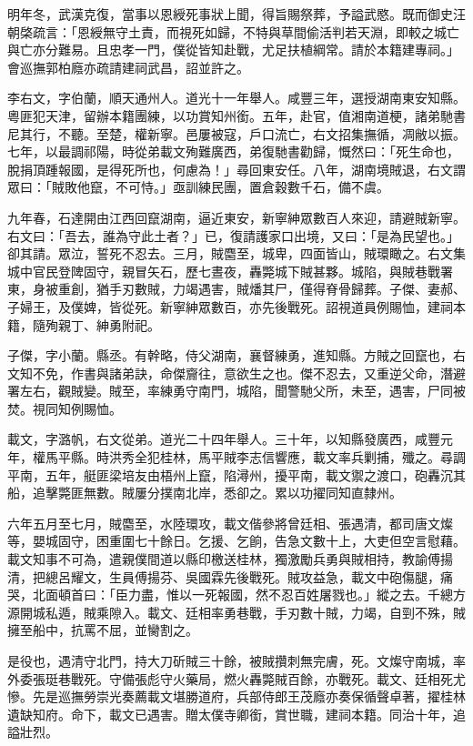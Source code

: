 \begin{pinyinscope}
明年冬，武漢克復，當事以恩綬死事狀上聞，得旨賜祭葬，予謚武愍。既而御史汪朝棨疏言：「恩綬無守土責，而視死如歸，不特與草間偷活判若天淵，即較之城亡與亡亦分難易。且忠孝一門，僕從皆知赴戰，尤足扶植綱常。請於本籍建專祠。」會巡撫郭柏廕亦疏請建祠武昌，詔並許之。

李右文，字伯蘭，順天通州人。道光十一年舉人。咸豐三年，選授湖南東安知縣。粵匪犯天津，留辦本籍團練，以功賞知州銜。五年，赴官，值湘南道梗，諸弟馳書尼其行，不聽。至楚，權新寧。邑屢被寇，戶口流亡，右文招集撫循，凋敝以振。七年，以最調祁陽，時從弟載文殉難廣西，弟復馳書勸歸，慨然曰：「死生命也，脫捐頂踵報國，是得死所也，何慮為！」尋回東安任。八年，湖南境賊退，右文謂眾曰：「賊敗他竄，不可恃。」亟訓練民團，置倉穀數千石，備不虞。

九年春，石達開由江西回竄湖南，逼近東安，新寧紳眾數百人來迎，請避賊新寧。右文曰：「吾去，誰為守此土者？」已，復請護家口出境，又曰：「是為民望也。」卻其請。眾泣，誓死不忍去。三月，賊麕至，城卑，四面皆山，賊環瞰之。右文集城中官民登陴固守，親冒矢石，歷七晝夜，轟斃城下賊甚夥。城陷，與賊巷戰署東，身被重創，猶手刃數賊，力竭遇害，賊燔其尸，僅得脊骨歸葬。子傑、妻郝、子婦王，及僕婢，皆從死。新寧紳眾數百，亦先後戰死。詔視道員例賜恤，建祠本籍，隨殉親丁、紳勇附祀。

子傑，字小蘭。縣丞。有幹略，侍父湖南，襄督練勇，進知縣。方賊之回竄也，右文知不免，作書與諸弟訣，命傑齎往，意欲生之也。傑不忍去，又重逆父命，潛避署左右，觀賊變。賊至，率練勇守南門，城陷，聞警馳父所，未至，遇害，尸同被焚。視同知例賜恤。

載文，字潞帆，右文從弟。道光二十四年舉人。三十年，以知縣發廣西，咸豐元年，權馬平縣。時洪秀全犯桂林，馬平賊李志信響應，載文率兵剿捕，殲之。尋調平南，五年，艇匪梁培友由梧州上竄，陷潯州，擾平南，載文禦之渡口，砲轟沉其船，追擊斃匪無數。賊屢分撲南北岸，悉卻之。累以功擢同知直隸州。

六年五月至七月，賊麕至，水陸環攻，載文偕參將曾廷相、張遇清，都司唐文燦等，嬰城固守，困重圍七十餘日。乞援、乞餉，告急文數十上，大吏但空言慰藉。載文知事不可為，遣親僕間道以縣印檄送桂林，獨激勵兵勇與賊相持，教諭傅揚清，把總呂耀文，生員傅揚芬、吳國霖先後戰死。賊攻益急，載文中砲傷腿，痛哭，北面頓首曰：「臣力盡，惟以一死報國，然不忍百姓屠戮也。」縱之去。千總方源開城私遁，賊乘隙入。載文、廷相率勇巷戰，手刃數十賊，力竭，自剄不殊，賊擁至船中，抗罵不屈，並臠割之。

是役也，遇清守北門，持大刀斫賊三十餘，被賊攢刺無完膚，死。文燦守南城，率外委張珽巷戰死。守備張彪守火藥局，燃火轟斃賊百餘，亦戰死。載文、廷相死尤慘。先是巡撫勞崇光奏薦載文堪勝道府，兵部侍郎王茂廕亦奏保循聲卓著，擢桂林遺缺知府。命下，載文已遇害。贈太僕寺卿銜，賞世職，建祠本籍。同治十年，追謚壯烈。


\end{pinyinscope}
